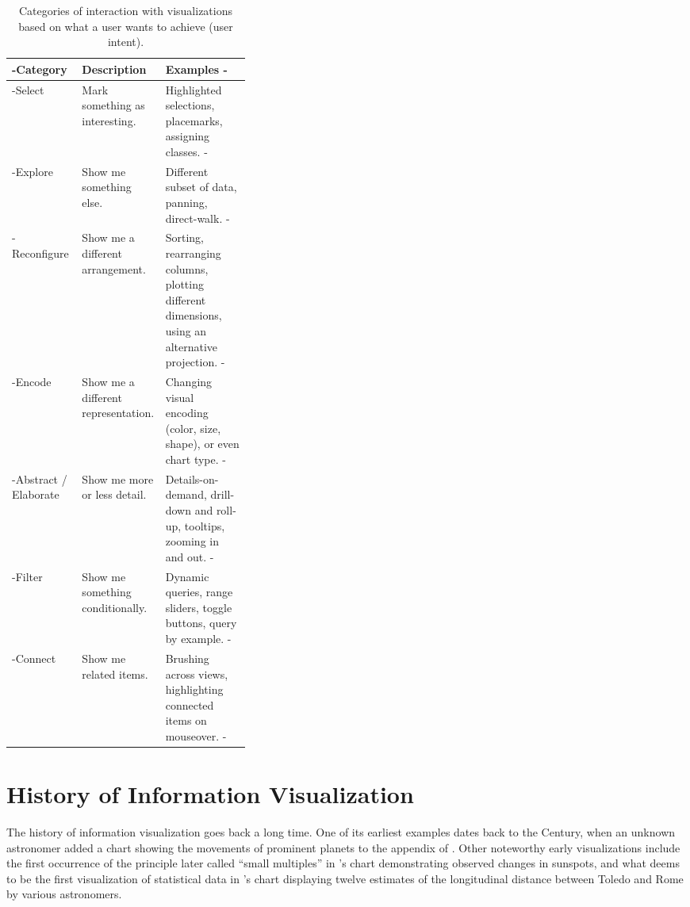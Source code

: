 \begin{table}[tp]
\tablestretch
{}
\centering
\begin{small}
\begin{tabularx}{\linewidth}{>{\kern-\tabcolsep}lL{0.35\linewidth}X<{\kern-\tabcolsep}}
\toprule
Category & Description & Examples \\
\midrule
Select &
  Mark something as interesting. &
  Highlighted selections, placemarks, assigning classes. \\
Explore &
  Show me something else. &
  Different subset of data, panning, direct-walk. \\
Reconfigure &
  Show me a different arrangement. &
  Sorting, rearranging columns, plotting different dimensions, using an alternative projection. \\
Encode &
  Show me a different representation. &
  Changing visual encoding (color, size, shape), or even chart type. \\
Abstract / Elaborate &
  Show me more or less detail. &
  Details-on-demand, drill-down and roll-up, tooltips, zooming in and out. \\
Filter &
  Show me something conditionally. &
  Dynamic queries, range sliders, toggle buttons, query by example. \\
Connect &
  Show me related items. &
  Brushing across views, highlighting connected items on mouseover. \\
\bottomrule
\end{tabularx}
\end{small}
\caption[Categories of Interaction Based on User Intent]{
Categories of interaction with visualizations based on what
a user wants to achieve (user intent).
}
\label{tab:UserIntentCategories}
\end{table}






\section{History of Information Visualization}

The history of information visualization goes back a long time. One of
its earliest examples dates back to the  Century, when an
unknown astronomer added a chart showing the movements of prominent
planets to the appendix of \parencite{CommentariiInSomniumScipionis}.
Other noteworthy early visualizations include the first occurrence of
the principle \textcite{VisualDisplayOfQuantitativeInformation} later
called \enquote{small multiples} in \textcite{RosaUrsina}'s chart
demonstrating observed changes in sunspots, and what
\textcite[15]{VisualExplanations} deems to be the first visualization
of statistical data in \textcite{RomeToledoBook}'s chart displaying
twelve estimates of the longitudinal distance between Toledo and Rome
by various astronomers.



